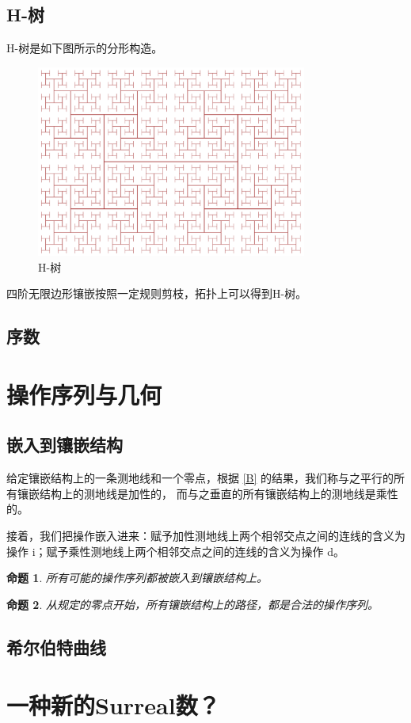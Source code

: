 \documentclass[a4paper,12pt]{article}
\newtheorem{proposition}{命题}
\begin{document}
\newpage

\subsection{H-树}

H-树是如下图所示的分形构造。

\begin{figure}[ht]
\centering
\includegraphics[width=3.5in]{images/2000px-H_tree.png}
\caption{H-树}
\end{figure}

四阶无限边形镶嵌按照一定规则剪枝，拓扑上可以得到H-树。

\subsection{序数}

\newpage

\section{操作序列与几何}

\subsection{嵌入到镶嵌结构}

给定镶嵌结构上的一条测地线和一个零点，根据 \ref{B} 的结果，我们称与之平行的所有镶嵌结构上的测地线是加性的，
而与之垂直的所有镶嵌结构上的测地线是乘性的。

接着，我们把操作嵌入进来：赋予加性测地线上两个相邻交点之间的连线的含义为操作 i；赋予乘性测地线上两个相邻交点之间的连线的含义为操作 d。

\begin{proposition}
\label{C}
所有可能的操作序列都被嵌入到镶嵌结构上。
\end{proposition}

\begin{proposition}
\label{D}
从规定的零点开始，所有镶嵌结构上的路径，都是合法的操作序列。
\end{proposition}


\subsection{希尔伯特曲线}

\section{一种新的Surreal数？}
\end{document}
